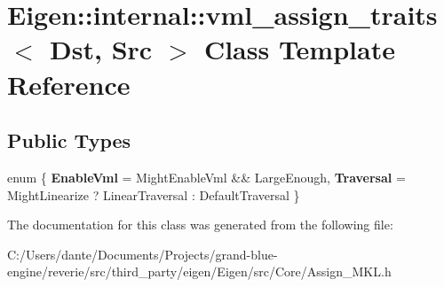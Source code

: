 \hypertarget{class_eigen_1_1internal_1_1vml__assign__traits}{}\section{Eigen\+::internal\+::vml\+\_\+assign\+\_\+traits$<$ Dst, Src $>$ Class Template Reference}
\label{class_eigen_1_1internal_1_1vml__assign__traits}
\subsection*{Public Types}
\begin{DoxyCompactItemize}
\item 
\mbox{\label{class_eigen_1_1internal_1_1vml__assign__traits_a2eec226ec8ae99ec38b3f4cc46ac90fb}} 
enum \{ {\bfseries Enable\+Vml} = Might\+Enable\+Vml \&\& Large\+Enough, 
{\bfseries Traversal} = Might\+Linearize ? Linear\+Traversal \+: Default\+Traversal
 \}
\end{DoxyCompactItemize}


The documentation for this class was generated from the following file\+:\begin{DoxyCompactItemize}
\item 
C\+:/\+Users/dante/\+Documents/\+Projects/grand-\/blue-\/engine/reverie/src/third\+\_\+party/eigen/\+Eigen/src/\+Core/Assign\+\_\+\+M\+K\+L.\+h\end{DoxyCompactItemize}
